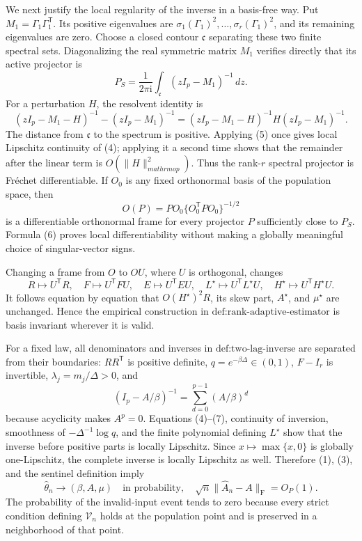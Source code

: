 We next justify the local regularity of the inverse in a basis-free way.  Put \(M_1=\Gamma_1\Gamma_1^{\mathsf T}\).  Its positive eigenvalues are \(\sigma_1(\Gamma_1)^2,\ldots,\sigma_r(\Gamma_1)^2\), and its remaining eigenvalues are zero.  Choose a closed contour \(\mathfrak c\) separating these two finite spectral sets.  Diagonalizing the real symmetric matrix \(M_1\) verifies directly that its active projector is
\[
 P_S=\frac{1}{2\pi\mathrm i}\int_{\mathfrak c}(zI_p-M_1)^{-1}\,dz.
\tag{4}
\]
For a perturbation \(H\), the resolvent identity is
\[
 (zI_p-M_1-H)^{-1}-(zI_p-M_1)^{-1}
 =(zI_p-M_1-H)^{-1}H(zI_p-M_1)^{-1}.
\tag{5}
\]
The distance from \(\mathfrak c\) to the spectrum is positive.  Applying (5) once gives local Lipschitz continuity of (4); applying it a second time shows that the remainder after the linear term is \(O(\lVert H\rVert_{mathrm{op}}^2)\).  Thus the rank-\(r\) spectral projector is Fr\'{e}chet differentiable.  If \(O_0\) is any fixed orthonormal basis of the population space, then
\[
 O(P)=P O_0\{O_0^{\mathsf T}P O_0\}^{-1/2}
\tag{6}
\]
is a differentiable orthonormal frame for every projector \(P\) sufficiently close to \(P_S\).  Formula (6) proves local differentiability without making a globally meaningful choice of singular-vector signs.

Changing a frame from \(O\) to \(O U\), where \(U\) is orthogonal, changes
\[
 R\mapsto U^{\mathsf T}R,\quad
 F\mapsto U^{\mathsf T}FU,\quad
 E\mapsto U^{\mathsf T}EU,\quad
 L^\star\mapsto U^{\mathsf T}L^\star U,\quad
 H^\star\mapsto U^{\mathsf T}H^\star U.
\]
It follows equation by equation that \(O(H^\star)^2R\), its skew part, \(A^\star\), and \(\mu^\star\) are unchanged.  Hence the empirical construction in \(\text{def:rank-adaptive-estimator}\) is basis invariant wherever it is valid.

For a fixed law, all denominators and inverses in \(\text{def:two-lag-inverse}\) are separated from their boundaries: \(RR^{\mathsf T}\) is positive definite, \(q=e^{-\beta\Delta}\in(0,1)\), \(F-I_r\) is invertible, \(\lambda_j=m_j/\Delta>0\), and
\[
 (I_p-A/\beta)^{-1}=\sum_{d=0}^{p-1}(A/\beta)^d
\tag{7}
\]
because acyclicity makes \(A^p=0\).  Equations (4)--(7), continuity of inversion, smoothness of \(-\Delta^{-1}\log q\), and the finite polynomial defining \(L^\star\) show that the inverse before positive parts is locally Lipschitz.  Since \(x\mapsto\max\{x,0\}\) is globally one-Lipschitz, the complete inverse is locally Lipschitz as well.  Therefore (1), (3), and the sentinel definition imply
\[
 \widehat\theta_n\longrightarrow(\beta,A,\mu)\quad\text{in probability},
\quad
 \sqrt n\lVert\widehat A_n-A\rVert_{\mathrm F}=O_P(1).
\tag{8}
\]
The probability of the invalid-input event tends to zero because every strict condition defining \(\mathcal V_n\) holds at the population point and is preserved in a neighborhood of that point.

